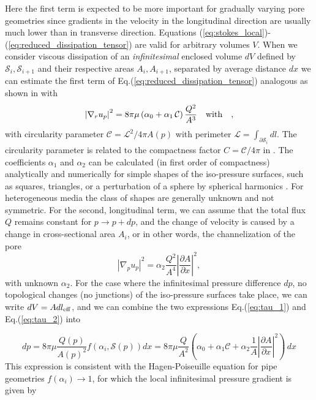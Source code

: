 \documentclass[draft]{agujournal2019}
\begin{document}
Here the first term is expected to be more important for gradually varying pore geometries since gradients in the velocity in the longitudinal direction are usually much lower than in transverse direction. Equations (\ref{eq:stokes_local})-(\ref{eq:reduced_dissipation_tensor}) are valid for arbitrary volumes $V$. When we consider viscous dissipation of an \textit{infinitesimal} enclosed volume $dV$ defined by $\mathcal{S}_i,\mathcal{S}_{i+1}$ and their respective areas $A_i, A_{i+1}$, separated by average distance $dx$ we can estimate the first term of Eq.(\ref{eq:reduced_dissipation_tensor}) analogous as shown in \cite{mortensen_reexamination_2005} with
\begin{equation}
	\left|\nabla_r u_p\right|^2 =8\pi\mu \left(\alpha_0+\alpha_1\,\mathcal{C}\right)\frac{ Q^2}{A^3}~~~ \rm{with}~~~ ,\label{eq:tau_1}
\end{equation}
with circularity parameter $\mathcal{C} = \mathcal{L}^2/4\pi A(p)$ with perimeter $\mathcal{L} = \int_{\partial \mathcal{S}_i}dl$. The circularity parameter is related to the compactness factor $C = \mathcal{C}/4\pi$ in \cite{mortensen_reexamination_2005}. The coefficients $\alpha_1$ and $\alpha_2$ can be calculated (in first order of compactness) analytically and numerically for simple shapes of the iso-pressure surfaces, such as squares, triangles, or a perturbation of a sphere by spherical harmonics . For heterogeneous media the class of shapes are generally unknown and not symmetric. 
For the second, longitudinal term, we can assume that the total flux $Q$ remains constant for $p\rightarrow p+dp$, and the change of velocity is caused by a change in cross-sectional area $A_i$, or in other words, the channelization of the pore 
\begin{equation}
	\left|\nabla_p u_p\right|^2 = \alpha_2  \frac{Q^2}{A^4}\left|\frac{\partial A}{\partial x }\right|^2,\label{eq:tau_2}
\end{equation}
with unknown $\alpha_2$. For the case where the infinitesimal pressure difference $dp$, no topological changes (no junctions) of the iso-pressure surfaces take place, we can write $dV = A dl_{\rm{eff}}$, and we can combine the two expressions Eq.(\ref{eq:tau_1}) and Eq.(\ref{eq:tau_2}) into

\begin{equation}
	dp = 8\pi \mu \frac{Q(p)}{A(p)^2} f\left(\alpha_i,\mathcal{S}(p) \right) dx= 8 \pi \mu\frac{Q}{A^2}\left(\alpha_0+\alpha_1\mathcal{C} + \alpha_2 \frac{1}{A}\left|\frac{\partial A}{\partial x}\right|^2\right)\,dx\label{eq:infi_dp}
\end{equation}
This expression is consistent with the Hagen-Poiseuille equation for pipe geometries $f(\alpha_i)\rightarrow 1$, for which the local infinitesimal pressure gradient is given by 
\end{document}
